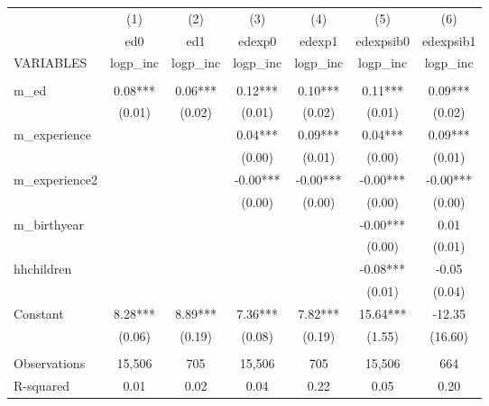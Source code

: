 \begin{tabular}{lcccccc} \hline
 & (1) & (2) & (3) & (4) & (5) & (6) \\
 & ed0 & ed1 & edexp0 & edexp1 & edexpsib0 & edexpsib1 \\
VARIABLES & logp\_inc & logp\_inc & logp\_inc & logp\_inc & logp\_inc & logp\_inc \\ \hline
 &  &  &  &  &  &  \\
m\_ed & 0.08*** & 0.06*** & 0.12*** & 0.10*** & 0.11*** & 0.09*** \\
 & (0.01) & (0.02) & (0.01) & (0.02) & (0.01) & (0.02) \\
m\_experience &  &  & 0.04*** & 0.09*** & 0.04*** & 0.09*** \\
 &  &  & (0.00) & (0.01) & (0.00) & (0.01) \\
m\_experience2 &  &  & -0.00*** & -0.00*** & -0.00*** & -0.00*** \\
 &  &  & (0.00) & (0.00) & (0.00) & (0.00) \\
m\_birthyear &  &  &  &  & -0.00*** & 0.01 \\
 &  &  &  &  & (0.00) & (0.01) \\
hhchildren &  &  &  &  & -0.08*** & -0.05 \\
 &  &  &  &  & (0.01) & (0.04) \\
Constant & 8.28*** & 8.89*** & 7.36*** & 7.82*** & 15.64*** & -12.35 \\
 & (0.06) & (0.19) & (0.08) & (0.19) & (1.55) & (16.60) \\
 &  &  &  &  &  &  \\
Observations & 15,506 & 705 & 15,506 & 705 & 15,506 & 664 \\
 R-squared & 0.01 & 0.02 & 0.04 & 0.22 & 0.05 & 0.20 \\ \hline
\end{tabular}
